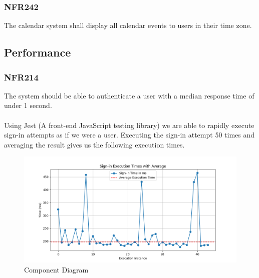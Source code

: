 \documentclass[12pt, titlepage]{article}
\begin{document}
\subsubsection{NFR242}
The calendar system shall display all calendar events to users in
their time zone.
\renewcommand{\arraystretch}{1.5}
\begin{center}
\end{center}

\subsection{Performance}
\subsubsection{NFR214}
The system should be able to authenticate a user with a median
response time of under 1 second.\\\\Using Jest (A front-end JavaScript testing library) we are able to rapidly execute sign-in attempts as if we were a user. Executing the sign-in attempt 50 times and averaging the result gives us the following execution times.


\begin{figure}[H]
    \includegraphics[width=\linewidth]{./imgs/signinTimes.png}
    \caption{Component Diagram}
    \label{fig: High level component diagram}
\end{figure}
\end{document}

